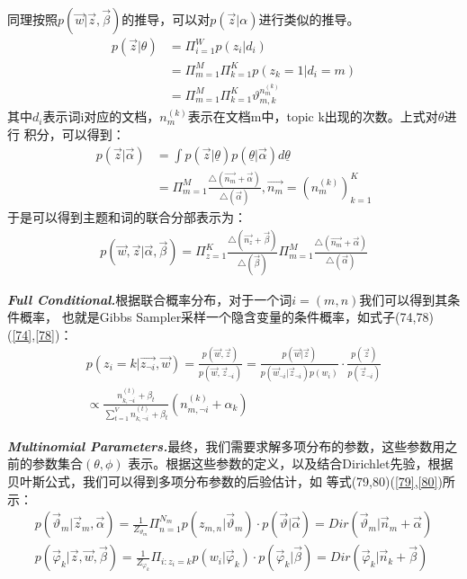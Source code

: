 \documentclass[UTF8]{ctexart}
\begin{document}
\par
同理按照$p(\vec{w}|\vec{z}, \vec{\beta})$的推导，可以对$p(\vec{z}|\alpha)$进行类似的推导。
\begin{align}
p(\vec{z}|\theta) &= \Pi_{i=1}^W p(z_i|d_i)
\\
&= \Pi_{m=1}^M\Pi_{k=1}^K p(z_k=1|d_i=m)
\\
&= \Pi_{m=1}^M\Pi_{k=1}^K \vartheta_{m,k}^{n_m^{(k)}}
\end{align}
其中$d_i$表示词i对应的文档，$n_m^{(k)}$表示在文档m中，topic k出现的次数。上式对$\theta$进行
积分，可以得到：
\begin{align}
p(\vec{z}|\vec{\alpha}) &= \int p(\vec{z}|\underline{\theta}) p(\underline{\theta}|\vec{\alpha}) 
d\underline{\theta}
\\
&= \Pi_{m=1}^M \frac{\triangle(\vec{n_m}+\vec{\alpha})}{\triangle(\vec{\alpha})},
\vec{n_m}=\left( n_m^{(k)}\right)_{k=1}^K
\end{align}
于是可以得到主题和词的联合分部表示为：
\begin{align}
p(\vec{w}, \vec{z} | \vec{\alpha}, \vec{\beta}) = 
\Pi_{z=1}^K \frac{\triangle(\vec{n_z}+\vec{\beta})}{\triangle(\vec{\beta})}
\Pi_{m=1}^M \frac{\triangle(\vec{n_m}+\vec{\alpha})}{\triangle(\vec{\alpha})}
\end{align}
\par
\textbf{\emph{Full Conditional.}}根据联合概率分布，对于一个词$i=(m,n)$我们可以得到其条件概率，
也就是Gibbs Sampler采样一个隐含变量的条件概率，如式子(74,78)(\ref{74},\ref{78})：
\begin{align}
\label{74}
p(z_i=k|\vec{z_{\neg i}}, \vec{w}) = \frac{p(\vec{w}, \vec{z})}{p(\vec{w}, \vec{z}_{\neg i})}
= \frac{p(\vec{w}|\vec{z})}{p(\vec{w}_{\neg i}|\vec{z}_{\neg i})p(w_i)} \cdot 
\frac{p(\vec{z})}{p(\vec{z}_{\neg i})}
\\
\label{78}
\propto \frac{n_{k,\neg i}^{(t)} + \beta_t}{\sum_{t=1}^V n_{k, \neg i}^{(t)}+\beta_{t}}
(n_{m, \neg i}^{(k)} + \alpha_{k})
\end{align}
\par
\textbf{\emph{Multinomial Parameters.}}最终，我们需要求解多项分布的参数，这些参数用之前的参数集合$(\theta, \phi)$
表示。根据这些参数的定义，以及结合Dirichlet先验，根据贝叶斯公式，我们可以得到多项分布参数的后验估计，如
等式(79,80)(\ref{79},\ref{80})所示：
\begin{align}
\label{79}
p(\vec{\vartheta}_m|\vec{z}_m,\vec{\alpha}) = \frac{1}{Z_{\vartheta _m}} \Pi_{n=1}^{N_m}
p(z_{m,n}|\vec{\vartheta}_m) \cdot p(\vec{\vartheta}|\vec{\alpha}) = Dir
(\vec{\vartheta}_m|\vec{n}_m+\vec{\alpha})
\\
\label{80}
p(\vec{\varphi}_k|\vec{z},\vec{w}, \vec{\beta}) = \frac{1}{Z_{\varphi _k}} \Pi_{i:z_i=k}
p(w_i|\vec{\varphi}_k) \cdot p(\vec{\varphi}_k|\vec{\beta}) = 
Dir(\vec{\varphi}_k | \vec{n}_k + \vec{\beta})
\end{align}
\end{document}
